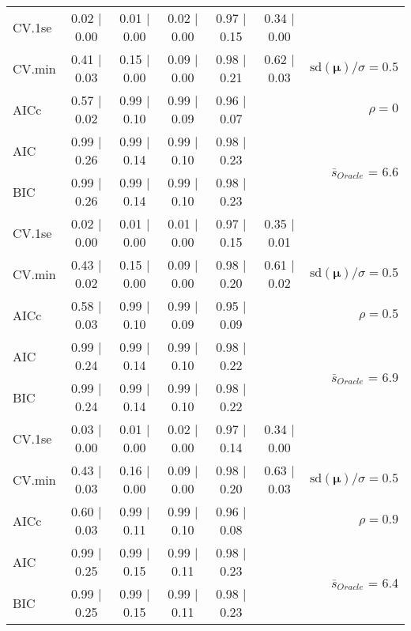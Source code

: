 \begin{table}
\begin{center}
\begin{tabular}{l*{5}{c}|r}
 \hline 
CV.1se & 0.02 $\mid$ 0.00 & 0.01 $\mid$ 0.00 & 0.02 $\mid$ 0.00 & 0.97 $\mid$ 0.15 & 0.34 $\mid$ 0.00 & \\
CV.min & 0.41 $\mid$ 0.03 & 0.15 $\mid$ 0.00 & 0.09 $\mid$ 0.00 & 0.98 $\mid$ 0.21 & 0.62 $\mid$ 0.03 &  $\mathrm{sd}(\mathbf{\mu})/\sigma=0.5$ \\
AICc & 0.57 $\mid$ 0.02 & 0.99 $\mid$ 0.10 & 0.99 $\mid$ 0.09 & 0.96 $\mid$ 0.07 & & $\rho=0$ \\
AIC & 0.99 $\mid$ 0.26 & 0.99 $\mid$ 0.14 & 0.99 $\mid$ 0.10 & 0.98 $\mid$ 0.23 & &  \multirow{2}{*}{$\bar{s}_{Oracle}$ = 6.6} \\
BIC & 0.99 $\mid$ 0.26 & 0.99 $\mid$ 0.14 & 0.99 $\mid$ 0.10 & 0.98 $\mid$ 0.23 & &  \\
 \hline 
CV.1se & 0.02 $\mid$ 0.00 & 0.01 $\mid$ 0.00 & 0.01 $\mid$ 0.00 & 0.97 $\mid$ 0.15 & 0.35 $\mid$ 0.01 & \\
CV.min & 0.43 $\mid$ 0.02 & 0.15 $\mid$ 0.00 & 0.09 $\mid$ 0.00 & 0.98 $\mid$ 0.20 & 0.61 $\mid$ 0.02 &  $\mathrm{sd}(\mathbf{\mu})/\sigma=0.5$ \\
AICc & 0.58 $\mid$ 0.03 & 0.99 $\mid$ 0.10 & 0.99 $\mid$ 0.09 & 0.95 $\mid$ 0.09 & & $\rho=0.5$ \\
AIC & 0.99 $\mid$ 0.24 & 0.99 $\mid$ 0.14 & 0.99 $\mid$ 0.10 & 0.98 $\mid$ 0.22 & &  \multirow{2}{*}{$\bar{s}_{Oracle}$ = 6.9} \\
BIC & 0.99 $\mid$ 0.24 & 0.99 $\mid$ 0.14 & 0.99 $\mid$ 0.10 & 0.98 $\mid$ 0.22 & &  \\
 \hline 
CV.1se & 0.03 $\mid$ 0.00 & 0.01 $\mid$ 0.00 & 0.02 $\mid$ 0.00 & 0.97 $\mid$ 0.14 & 0.34 $\mid$ 0.00 & \\
CV.min & 0.43 $\mid$ 0.03 & 0.16 $\mid$ 0.00 & 0.09 $\mid$ 0.00 & 0.98 $\mid$ 0.20 & 0.63 $\mid$ 0.03 &  $\mathrm{sd}(\mathbf{\mu})/\sigma=0.5$ \\
AICc & 0.60 $\mid$ 0.03 & 0.99 $\mid$ 0.11 & 0.99 $\mid$ 0.10 & 0.96 $\mid$ 0.08 & & $\rho=0.9$ \\
AIC & 0.99 $\mid$ 0.25 & 0.99 $\mid$ 0.15 & 0.99 $\mid$ 0.11 & 0.98 $\mid$ 0.23 & &  \multirow{2}{*}{$\bar{s}_{Oracle}$ = 6.4} \\
BIC & 0.99 $\mid$ 0.25 & 0.99 $\mid$ 0.15 & 0.99 $\mid$ 0.11 & 0.98 $\mid$ 0.23 & &  \\
 \hline 
\end{tabular}
\end{center}
\vspace{-1cm}
\end{table}




